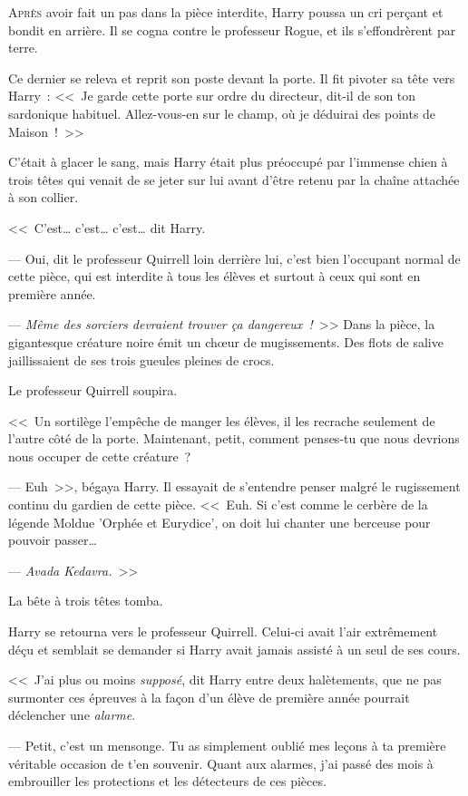 
\lettrine{A}{près} avoir fait un pas dans la pièce interdite, Harry poussa un cri perçant et bondit en arrière. Il se cogna contre le professeur Rogue, et ils s'effondrèrent par terre.

Ce dernier se releva et reprit son poste devant la porte. Il fit pivoter sa tête vers Harry~: <<~Je garde cette porte sur ordre du directeur, dit-il de son ton sardonique habituel. Allez-vous-en sur le champ, où je déduirai des points de Maison~!~>>

C'était à glacer le sang, mais Harry était plus préoccupé par l'immense chien à trois têtes qui venait de se jeter sur lui avant d'être retenu par la chaîne attachée à son collier.

<<~C'est… c'est… c'est… dit Harry.

--- Oui, dit le professeur Quirrell loin derrière lui, c'est bien l'occupant normal de cette pièce, qui est interdite à tous les élèves et surtout à ceux qui sont en première année.

--- \emph{Même des sorciers devraient trouver ça dangereux~!}~>> Dans la pièce, la gigantesque créature noire émit un chœur de mugissements. Des flots de salive jaillissaient de ses trois gueules pleines de crocs.

Le professeur Quirrell soupira.

<<~Un sortilège l'empêche de manger les élèves, il les recrache seulement de l'autre côté de la porte. Maintenant, petit, comment penses-tu que nous devrions nous occuper de cette créature~?

--- Euh~>>, bégaya Harry. Il essayait de s'entendre penser malgré le rugissement continu du gardien de cette pièce. <<~Euh. Si c'est comme le cerbère de la légende Moldue 'Orphée et Eurydice', on doit lui chanter une berceuse pour pouvoir passer…

--- \emph{Avada Kedavra.}~>>

La bête à trois têtes tomba.

Harry se retourna vers le professeur Quirrell. Celui-ci avait l'air extrêmement déçu et semblait se demander si Harry avait jamais assisté à un seul de ses cours.

<<~J'ai plus ou moins \emph{supposé}, dit Harry entre deux halètements, que ne pas surmonter ces épreuves à la façon d'un élève de première année pourrait déclencher une \emph{alarme}.

--- Petit, c'est un mensonge. Tu as simplement oublié mes leçons à ta première véritable occasion de t'en souvenir. Quant aux alarmes, j'ai passé des mois à embrouiller les protections et les détecteurs de ces pièces.

